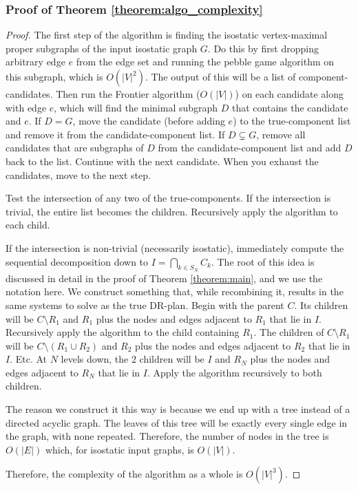 \subsubsection{Proof of Theorem \ref{theorem:algo_complexity}}

\begin{proof}
The first step of the algorithm is finding the isostatic vertex-maximal proper subgraphs of the input isostatic graph $G$. Do this by first dropping arbitrary edge $e$ from the edge set and running the pebble game algorithm \cite{Jacobs:1997:PG} on this subgraph, which is $O(|V|^2)$. The output of this will be a list of component-candidates. Then run the Frontier algorithm \cite{hoffman2001decompositionII} \cite{lomonosov2004graph} ($O(|V|)$) on each candidate along with edge $e$, which will find the minimal subgraph $D$ that contains the candidate and $e$. If $D=G$, move the candidate (before adding $e$) to the true-component list and remove it from the candidate-component list. If $D\subsetneq G$, remove all candidates that are subgraphs of $D$ from the candidate-component list and add $D$ back to the list. Continue with the next candidate. When you exhaust the candidates, move to the next step.

Test the intersection of any two of the true-components. If the intersection is trivial, the entire list becomes the children. Recursively apply the algorithm to each child.

If the intersection is non-trivial (necessarily isostatic), immediately compute the sequential decomposition down to $I=\bigcap_{k\in S_N}{C_k}$. The root of this idea is discussed in detail in the proof of Theorem \ref{theorem:main}, and we use the notation here. We construct something that, while recombining it, results in the same systems to solve as the true DR-plan. Begin with the parent $C$. Its children will be $C\setminus R_1$ and $R_1$ plus the nodes and edges adjacent to $R_1$ that lie in $I$. Recursively apply the algorithm to the child containing $R_1$. The children of $C\setminus R_1$ will be $C\setminus (R_1\cup R_2)$ and $R_2$ plus the nodes and edges adjacent to $R_2$ that lie in $I$. Etc. At $N$ levels down, the 2 children will be $I$ and $R_N$ plus the nodes and edges adjacent to $R_N$ that lie in $I$. Apply the algorithm recursively to both children.

The reason we construct it this way is because we end up with a tree instead of a directed acyclic graph. The leaves of this tree will be exactly every single edge in the graph, with none repeated. Therefore, the number of nodes in the tree is $O(|E|)$ which, for isostatic input graphs, is $O(|V|)$.

Therefore, the complexity of the algorithm as a whole is $O(|V|^3)$.
%
\end{proof}


